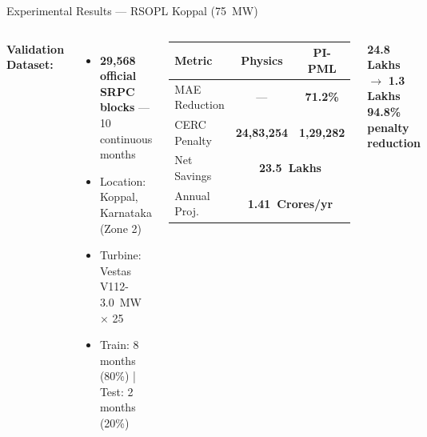 \documentclass[aspectratio=169,10pt]{beamer}
\newcommand{\emphblue}[1]{{\color{WindBlue}\textbf{#1}}}
\newcommand{\emphgreen}[1]{{\color{MLgreen}\textbf{#1}}}
\newcommand{\emphred}[1]{{\color{DSMred}\textbf{#1}}}
\newcommand{\rupee}{\textnumero}
\begin{document}
\begin{frame}{Experimental Results — RSOPL Koppal (75~MW)}
  \begin{columns}[T]
      \textbf{Validation Dataset:}
      \begin{itemize}[leftmargin=1em, itemsep=3pt, font=\small]
        \item \emphblue{29,568 official SRPC blocks} — 10 continuous months
        \item Location: Koppal, Karnataka (Zone 2)
        \item Turbine: Vestas V112-3.0~MW $\times$ 25
        \item Train: 8 months (80\%) | Test: 2 months (20\%)
      \end{itemize}

      \vspace{8pt}
      \begin{center}
        \renewcommand{\arraystretch}{1.45}
        \small
        \begin{tabular}{@{}lcc@{}}
          \toprule
          \textbf{Metric} & \textbf{Physics} & \textbf{PI-PML} \\
          \midrule
          \rowcolor{gray!8}
          MAE Reduction & --- & \emphgreen{\textbf{71.2\%}} \\
          CERC Penalty & \emphred{\rupee{}24,83,254} & \emphgreen{\rupee{}1,29,282} \\
          \rowcolor{gray!8}
          Net Savings & \multicolumn{2}{c}{\emphgreen{\textbf{\rupee{}23.5~Lakhs}}} \\
          Annual Proj. & \multicolumn{2}{c}{\emphgreen{\textbf{\rupee{}1.41~Crores/yr}}} \\
          \bottomrule
        \end{tabular}
      \end{center}

      \vspace{6pt}
      \begin{tcolorbox}[greenbox, title={Penalty Reduction}]
        \centering\small
        \emphred{\rupee{}24.8 Lakhs} $\longrightarrow$ \emphgreen{\rupee{}1.3 Lakhs}\\[2pt]
        \textbf{94.8\% penalty reduction}
      \end{tcolorbox}


\end{columns}
\end{frame}
\end{document}
